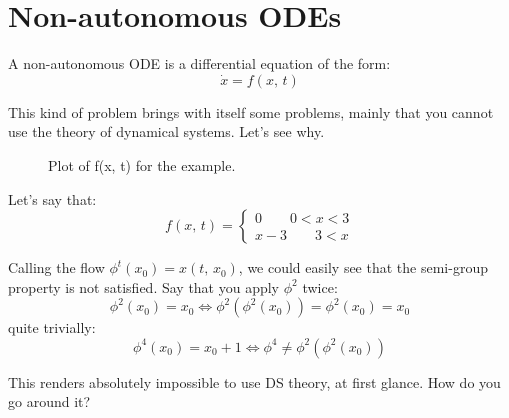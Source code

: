 \section{Non-autonomous ODEs}
\begin{definition}
    A non-autonomous ODE is a differential equation of the form:
    \begin{equation*}
        \dot{x}=f(x,\,t)
    \end{equation*}
\end{definition}
This kind of problem brings with itself some problems, mainly that you cannot use the theory of dynamical systems. Let's see why.
\begin{example}
    \begin{figure}[ht]
        \centering
        \caption{Plot of f(x, t) for the example.}
    \end{figure}
    
    Let's say that:
    \begin{equation*}
        f(x,\,t)=\begin{cases}
            0 \qquad 0<x<3 \\
            x-3 \qquad 3<x
        \end{cases}
    \end{equation*}

    Calling the flow $\phi^t(x_0)=x(t,\,x_0)$, we could easily see that the semi-group property is not satisfied. Say that you apply $\phi^2$ twice:
    \begin{equation*}
        \phi^2(x_0)=x_0 \Leftrightarrow \phi^2(\phi^2(x_0))=\phi^2(x_0)=x_0
    \end{equation*}
    quite trivially:
    \begin{equation*}
    \phi^4(x_0)=x_0+1 \Leftrightarrow \phi^4\neq\phi^2(\phi^2(x_0))
    \end{equation*}
\end{example}

This renders absolutely impossible to use DS theory, at first glance. How do you go around it? 



